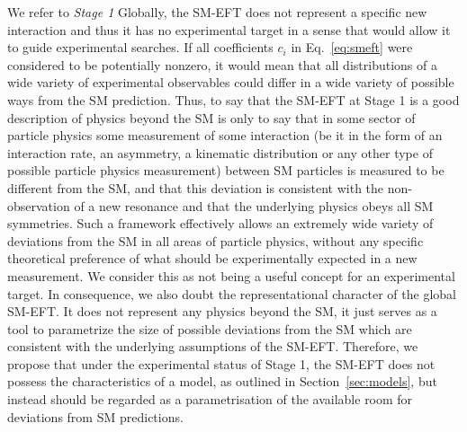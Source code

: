 We refer to \emph{Stage 1} 
Globally, the SM-EFT does not represent a specific new interaction
and thus it has no experimental target in a sense that would allow it to
guide experimental searches.  If all coefficients 
$c_i$ in Eq.~\ref{eq:smeft}
were considered to be potentially nonzero, it would mean that all
distributions of a wide variety of experimental observables could
differ in a wide variety of possible ways from the SM prediction.
Thus, to say that the SM-EFT at Stage 1 is a
good description of physics beyond the SM is only to say that in some
sector of particle physics some measurement of some interaction (be it
in the form of an interaction rate, an asymmetry, a kinematic
distribution or any other type of possible particle physics
measurement) between SM particles is measured to be different from
the SM, and that this deviation is consistent with the non-observation
of a new resonance and that the underlying physics obeys all SM
symmetries. 
Such a framework effectively allows an extremely wide variety
of deviations from the SM in all areas of particle physics, without
any specific theoretical preference of what should be experimentally
expected in a new measurement. We consider this as not being a
useful concept for an experimental target. In consequence, we also doubt the
representational character of the global SM-EFT. It does not represent any physics beyond the SM, it just serves as a tool to
parametrize the size of possible deviations from the SM which are
consistent with the underlying assumptions of the SM-EFT. Therefore,
we propose that under the experimental status of Stage 1, the SM-EFT does
not possess the characteristics of a model, as outlined in
Section~\ref{sec:models}, but instead should be regarded as a
parametrisation of the available room for deviations from SM
predictions.

